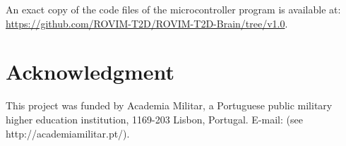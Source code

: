 \documentclass[journal]{IEEEtran}
\begin{document}
An exact copy of the code files of the microcontroller program is available at: \url{https://github.com/ROVIM-T2D/ROVIM-T2D-Brain/tree/v1.0}.



\section*{Acknowledgment}

This project was funded by Academia Militar, a Portuguese public military higher education institution, 1169-203 Lisbon, Portugal. E-mail: (see http://academiamilitar.pt/).




\ifCLASSOPTIONcaptionsoff
  \newpage
\fi







%
%
%
\end{document}
